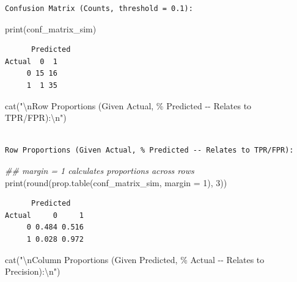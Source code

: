 \documentclass[
  letterpaper,
]{scrbook}
\newenvironment{Shaded}{\begin{snugshade}}{\end{snugshade}}
\newcommand{\AttributeTok}[1]{\textcolor[rgb]{0.40,0.45,0.13}{#1}}
\newcommand{\DecValTok}[1]{\textcolor[rgb]{0.68,0.00,0.00}{#1}}
\newcommand{\DocumentationTok}[1]{\textcolor[rgb]{0.37,0.37,0.37}{\textit{#1}}}
\newcommand{\FunctionTok}[1]{\textcolor[rgb]{0.28,0.35,0.67}{#1}}
\newcommand{\NormalTok}[1]{\textcolor[rgb]{0.00,0.23,0.31}{#1}}
\newcommand{\SpecialCharTok}[1]{\textcolor[rgb]{0.37,0.37,0.37}{#1}}
\newcommand{\StringTok}[1]{\textcolor[rgb]{0.13,0.47,0.30}{#1}}
\begin{document}
\begin{verbatim}
Confusion Matrix (Counts, threshold = 0.1):
\end{verbatim}

\begin{Shaded}
\begin{Highlighting}[]
\FunctionTok{print}\NormalTok{(conf\_matrix\_sim)}
\end{Highlighting}
\end{Shaded}

\begin{verbatim}
      Predicted
Actual  0  1
     0 15 16
     1  1 35
\end{verbatim}

\begin{Shaded}
\begin{Highlighting}[]
\FunctionTok{cat}\NormalTok{(}\StringTok{"}\SpecialCharTok{\textbackslash{}n}\StringTok{Row Proportions (Given Actual, \% Predicted {-}{-} Relates to TPR/FPR):}\SpecialCharTok{\textbackslash{}n}\StringTok{"}\NormalTok{)}
\end{Highlighting}
\end{Shaded}

\begin{verbatim}

Row Proportions (Given Actual, % Predicted -- Relates to TPR/FPR):
\end{verbatim}

\begin{Shaded}
\begin{Highlighting}[]
\DocumentationTok{\#\# margin = 1 calculates proportions across rows}
\FunctionTok{print}\NormalTok{(}\FunctionTok{round}\NormalTok{(}\FunctionTok{prop.table}\NormalTok{(conf\_matrix\_sim, }\AttributeTok{margin =} \DecValTok{1}\NormalTok{), }\DecValTok{3}\NormalTok{))}
\end{Highlighting}
\end{Shaded}

\begin{verbatim}
      Predicted
Actual     0     1
     0 0.484 0.516
     1 0.028 0.972
\end{verbatim}

\begin{Shaded}
\begin{Highlighting}[]
\FunctionTok{cat}\NormalTok{(}\StringTok{"}\SpecialCharTok{\textbackslash{}n}\StringTok{Column Proportions (Given Predicted, \% Actual {-}{-} Relates to Precision):}\SpecialCharTok{\textbackslash{}n}\StringTok{"}\NormalTok{)}
\end{Highlighting}
\end{Shaded}
\end{document}
